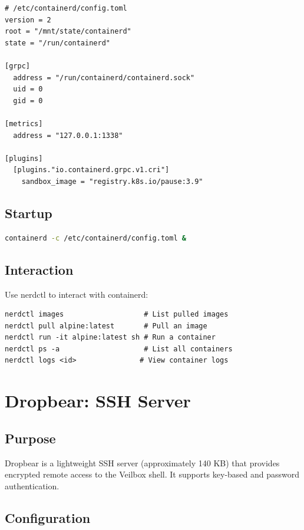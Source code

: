 \begin{lstlisting}
# /etc/containerd/config.toml
version = 2
root = "/mnt/state/containerd"
state = "/run/containerd"

[grpc]
  address = "/run/containerd/containerd.sock"
  uid = 0
  gid = 0

[metrics]
  address = "127.0.0.1:1338"

[plugins]
  [plugins."io.containerd.grpc.v1.cri"]
    sandbox_image = "registry.k8s.io/pause:3.9"
\end{lstlisting}

\subsection{Startup}

\begin{lstlisting}[language=bash]
containerd -c /etc/containerd/config.toml &
\end{lstlisting}

\subsection{Interaction}

Use nerdctl to interact with containerd:
\begin{lstlisting}
nerdctl images                   # List pulled images
nerdctl pull alpine:latest       # Pull an image
nerdctl run -it alpine:latest sh # Run a container
nerdctl ps -a                    # List all containers
nerdctl logs <id>               # View container logs
\end{lstlisting}

\section{Dropbear: SSH Server}

\subsection{Purpose}

Dropbear is a lightweight SSH server (approximately 140 KB) that provides
encrypted remote access to the Veilbox shell. It supports key-based and
password authentication.

\subsection{Configuration}

